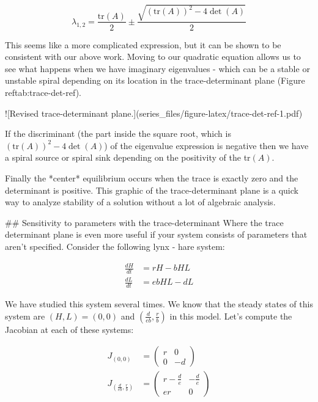 \documentclass[
]{book}
\theoremstyle{definition}
\theoremstyle{definition}
\theoremstyle{definition}
\theoremstyle{remark}
\begin{document}
\begin{equation}\label{eq:roots}
\lambda_{1,2}= \frac{\mbox{tr}(A)}{2} \pm \frac{\sqrt{ (\mbox{tr}(A))^2-4 \det(A)}}{2}
\end{equation}

This seems like a more complicated expression, but it can be shown to be consistent with our above work.  Moving to our quadratic equation allows us to see what happens when we have imaginary eigenvalues - which can be a stable or unstable spiral depending on its location in the trace-determinant plane (Figure \\ref{tab:trace-det-ref}).

![\label{fig:trace-det-ref}Revised trace-determinant plane.](series_files/figure-latex/trace-det-ref-1.pdf) 

If the discriminant (the part inside the square root, which is $(\mbox{tr}(A))^2-4 \det(A)$) of the eigenvalue expression is negative then we have a spiral source or spiral sink depending on the positivity of the tr$(A)$.

Finally the *center* equilibrium occurs when the trace is exactly zero and the determinant is positive.  This graphic of the trace-determinant plane is a quick way to analyze stability of a solution without a lot of algebraic analysis.


## Sensitivity to parameters with the trace-determinant
Where the trace determinant plane is even more useful if your system consists of parameters that aren't specified.  Consider the following lynx - hare system:

\begin{equation}
\begin{split}
\frac{dH}{dt} &= r H - b HL \\
\frac{dL}{dt} &=ebHL -dL
\end{split}
\end{equation}

We have studied this system several times.  We know that the steady states of this system are $(H,L)=(0,0)$ and $\displaystyle \left( \frac{d}{eb}, \frac{r}{b} \right)$ in this model.  Let's compute the Jacobian at each of these systems:

\begin{align}
J_{(0,0)} &=\begin{pmatrix} r & 0 \\ 0 & -d \end{pmatrix} \\
J_{(\frac{d}{eb}, \frac{r}{b})} &=\begin{pmatrix} r-\frac{d}{e} & -\frac{d}{e} \\ er & 0 \end{pmatrix}
\end{align}
\end{document}
